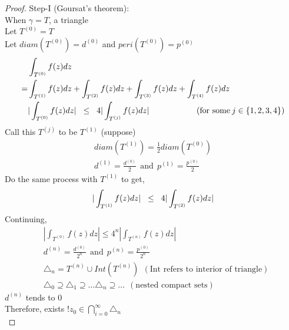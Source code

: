 \begin{proof}
Step-I (Goursat's theorem): \\
When $\gamma=T$, a triangle\\
Let $T^{(0)}=T$\\
Let $diam(T^{(0)})=d^{(0)}$ and $peri(T^{(0)})=p^{(0)}$
\begin{equation*}
\begin{split}
&\int_{T^{(0)}}^{} f(z) dz \\
=&\int_{T^{(1)}}^{} f(z) dz + \int_{T^{(2)}}^{} f(z) dz + \int_{T^{(3)}}^{} f(z) dz + \int_{T^{(4)}}^{} f(z) dz \\
&|\int_{T^{(0)}}^{} f(z) dz| \hspace{2mm}\leq \hspace{2mm} 4|\int_{T^{(j)}}^{} f(z) dz| \:\:\:\:\:\:\:\:\:\:\:\:\:\:\:\:\:\:\:\:\:\:\:\:\:\:(\text{for some}\: j\in \{1,2,3,4\})
\end{split}
\end{equation*}
Call this $T^{(j)}$ to be $T^{(1)}$ (suppose)
\begin{equation*}
\begin{split} 
diam(T^{(1)})=\frac{1}{2}diam(T^{(0)}) \\
d^{(1)}=\frac{d^{(0)}}{2}\:\: \text{and}\:\: p^{(1)}=\frac{p^{(0)}}{2}
\end{split}
\end{equation*}
Do the same process with $T^{(1)}$ to get, 
\begin{equation*} |\int_{T^{(1)}}^{} f(z) dz| \hspace{2mm}\leq \hspace{2mm}4|\int_{T^{(2)}}^{} f(z) dz| \end{equation*}
Continuing, 
\begin{equation*} 
\begin{split}
&|\int_{T^{(0)}}^{} f(z) dz| \leq 4^n|\int_{T^{(n)}}^{} f(z) dz| \\
&d^{(n)}=\frac{d^{(0)}}{2^n}\:\: \text{and}\:\: p^{(n)}=\frac{p^{(0)}}{2^n} \\
&\triangle_n= T^{(n)} \cup Int(T^{(n)}) \:\:(\text{Int refers to interior of triangle}) \\
&\triangle_0\supseteq \triangle_1 \supseteq \dots \triangle_n\supseteq \dots \:\: (\text{nested compact sets})
\end{split}
\end{equation*}
$d^{(n)}$ tends to $0$\\
Therefore, exists $!z_0 \in \bigcap_{i=0}^{\infty} \triangle_n$ \\

\end{proof}
